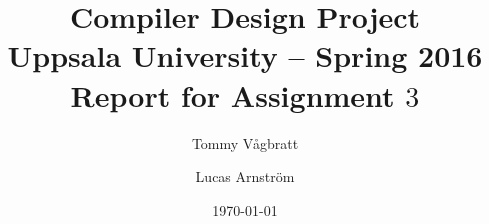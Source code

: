 \documentclass[a4paper,11pt]{article}
\title{\textbf{Compiler Design Project\\
  Uppsala University -- Spring 2016 \\
    Report for Assignment $3$}}
\author{Tommy V\aa gbratt \and Lucas Arnstr\"om}
\date{\today}
\begin{document}
\maketitle

\noindent


\end{document}
